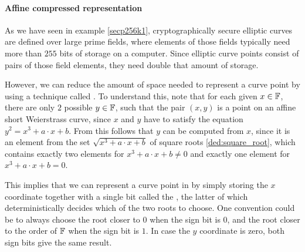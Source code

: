 \paragraph{Affine compressed representation}
\label{sec:affine_point_compression}
As we have seen in example \ref{secp256k1}, cryptographically secure elliptic curves are defined over large prime fields, where elements of those fields typically need more than $255$ bits of storage on a computer. Since elliptic curve points consist of pairs of those field elements, they need double that amount of storage.

However, we can reduce the amount of space needed to represent a curve point by using a technique called . To understand this, note that for each given $x\in\mathbb{F}$, there are only $2$ possible $y\in \mathbb{F}$, such that the pair $(x,y)$ is a point on an affine short Weierstrass curve, since $x$ and $y$ have to satisfy the equation $y^2 = x^3 + a\cdot x + b$. From this follows that $y$ can be computed from $x$, since it is an element from the set $\sqrt{x^3 + a\cdot x +b}$ of square roots \ref{ded:square_root}, which contains exactly two elements for $x^3 + a\cdot x +b\neq 0$ and exactly one element for $x^3 + a\cdot x +b=0$. 

This implies that we can represent a curve point in  by simply storing the $x$ coordinate together with a single bit called the , the latter of which deterministically decides which of the two roots to choose. One convention could be to always choose the root closer to $0$ when the sign bit is $0$, and the root closer to the order of $\mathbb{F}$ when the sign bit is $1$. In case the $y$ coordinate is zero, both sign bits give the same result.

